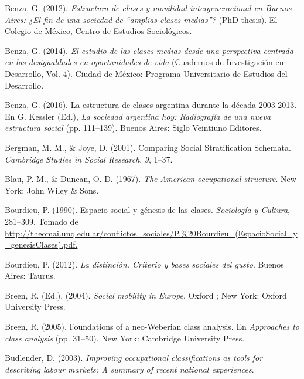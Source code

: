 \documentclass[
]{article}
\newlength{\cslhangindent}
\newlength{\cslentryspacingunit} %
\newenvironment{CSLReferences}[2] %
 {%
  \setlength{\parindent}{0pt}
  \ifodd #1
  \let\oldpar\par
  \def\par{\hangindent=\cslhangindent\oldpar}
  \fi
  \setlength{\parskip}{#2\cslentryspacingunit}
 }%
 {}
\begin{document}
\begin{CSLReferences}{1}{0}
\leavevmode{}%
Benza, G. (2012). \emph{Estructura de clases y movilidad intergeneracional en {Buenos} {Aires}: ¿El fin de una sociedad de {``amplias clases medias''}?} (PhD thesis). El Colegio de México, Centro de Estudios Sociológicos.

\leavevmode{}%
Benza, G. (2014). \emph{El estudio de las clases medias desde una perspectiva centrada en las desigualdades en oportunidades de vida} (Cuadernos de Investigación en Desarrollo, Vol. 4). Ciudad de México: Programa Universitario de Estudios del Desarrollo.

\leavevmode{}%
Benza, G. (2016). La estructura de clases argentina durante la década 2003-2013. En G. Kessler (Ed.), \emph{La sociedad argentina hoy: Radiografía de una nueva estructura social} (pp. 111--139). Buenos Aires: Siglo Veintiuno Editores.

\leavevmode{}%
Bergman, M. M., \& Joye, D. (2001). Comparing {Social} {Stratification} {Schemata}. \emph{Cambridge Studies in Social Research}, \emph{9}, 1--37.

\leavevmode{}%
Blau, P. M., \& Duncan, O. D. (1967). \emph{The {American} occupational structure}. New York: John Wiley \& Sons.

\leavevmode{}%
Bourdieu, P. (1990). Espacio social y génesis de las clases. \emph{Sociología y Cultura}, 281--309. Tomado de \href{http://theomai.unq.edu.ar/conflictos_sociales/P.\%20Bourdieu_(EspacioSocial_y_genesisClases).pdf}{http://theomai.unq.edu.ar/conflictos\_sociales/P.\%20Bourdieu\_(EspacioSocial\_y\_genesisClases).pdf.}

\leavevmode{}%
Bourdieu, P. (2012). \emph{La distinción. {Criterio} y bases sociales del gusto}. Buenos Aires: Taurus.

\leavevmode{}%
Breen, R. (Ed.). (2004). \emph{Social mobility in {Europe}}. Oxford ; New York: Oxford University Press.

\leavevmode{}%
Breen, R. (2005). Foundations of a neo-{Weberian} class analysis. En \emph{Approaches to class analysis} (pp. 31--50). New York: Cambridge University Press.

\leavevmode{}%
Budlender, D. (2003). \emph{Improving occupational classifications as tools for describing labour markets: {A} summary of recent national experiences}.


\end{CSLReferences}
\end{document}
